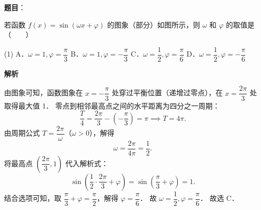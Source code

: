 \begin{answer}

\textbf{题目}：

若函数 $f(x) = \sin(\omega x + \varphi)$ 的图象（部分）如图所示，则 $\omega$ 和 $\varphi$ 的取值是\mbox{（　　）}
\nopagebreak[4]
\begin{center}\end{center}
\nopagebreak[4]
\begin{gkopts}(1)
\task A．$\omega = 1, \varphi = \dfrac{\pi}{3}$
\task B．$\omega = 1, \varphi = -\dfrac{\pi}{3}$
\task C．$\omega = \dfrac{1}{2}, \varphi = \dfrac{\pi}{6}$
\task D．$\omega = \dfrac{1}{2}, \varphi = -\dfrac{\pi}{6}$
\end{gkopts}

\textbf{解析}
\nopagebreak[4]
\begin{center}\end{center}
\nopagebreak[4]
由图象可知，函数图象在 $x = -\dfrac{\pi}{3}$ 处穿过平衡位置（递增过零点），在 $x = \dfrac{2\pi}{3}$ 处取得最大值 1．
零点到相邻最高点之间的水平距离为四分之一周期：
\nopagebreak[4]
\[
\frac{T}{4} = \frac{2\pi}{3} - \left(-\frac{\pi}{3}\right) = \pi \implies T = 4\pi.
\]
由周期公式 $T = \dfrac{2\pi}{\omega}$（$\omega > 0$），解得
\nopagebreak[4]
\[
\omega = \frac{2\pi}{4\pi} = \frac{1}{2}.
\]
将最高点 $\left(\dfrac{2\pi}{3}, 1\right)$ 代入解析式：
\nopagebreak[4]
\[
\sin\left(\frac{1}{2} \cdot \frac{2\pi}{3} + \varphi\right) = \sin\left(\frac{\pi}{3} + \varphi\right) = 1.
\]
结合选项可知，取 $\dfrac{\pi}{3} + \varphi = \dfrac{\pi}{2}$，解得 $\varphi = \dfrac{\pi}{6}$．
故 $\omega = \dfrac{1}{2}, \varphi = \dfrac{\pi}{6}$．
故选 C．


\end{answer}
